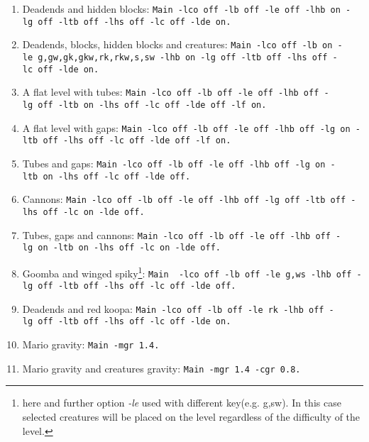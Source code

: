 \documentclass{report}
\begin{document}
\begin{enumerate}
\item Deadends and hidden blocks:\newline %
\texttt{Main~-lco~off~-lb~off~-le~off~-lhb~on~-lg~off~-ltb~off~-lhs~off~-lc~off~-lde~on.}
\item Deadends, blocks, hidden blocks and creatures:\newline %
\texttt{Main~-lco~off~-lb~on~-le~g,gw,gk,gkw,rk,rkw,s,sw~-lhb~on~-lg~off~-ltb~off~-lhs~off~-lc~off~-lde~on.}
\item A flat level with tubes: \newline %
\texttt{Main~-lco~off~-lb~off~-le~off~-lhb~off~-lg~off~-ltb~on~-lhs~off~-lc~off~-lde~off~-lf~on.}
\item A flat level with gaps: \newline %
\texttt{Main~-lco~off~-lb~off~-le~off~-lhb~off~-lg~on~-ltb~off~-lhs~off~-lc~off~-lde~off~-lf~on.}
\item Tubes and gaps: \newline %
\texttt{Main~-lco~off~-lb~off~-le~off~-lhb~off~-lg~on~-ltb~on~-lhs~off~-lc~off~-lde~off.}
\item Cannons: \newline %
\texttt{Main~-lco~off~-lb~off~-le~off~-lhb~off~-lg~off~-ltb~off~-lhs~off~-lc~on~-lde~off.}
\item Tubes, gaps and cannons: \newline %
\texttt{Main~-lco~off~-lb~off~-le~off~-lhb~off~-lg~on~-ltb~on~-lhs~off~-lc~on~-lde~off.}
\item Goomba and winged spiky\footnote{here and further option \emph{-le} used with different key(e.g. g,sw). In this case selected creatures will be placed on the level regardless of the difficulty of the level.}: \newline %
\texttt{Main ~-lco~off~-lb~off~-le~g,ws~-lhb~off~-lg~off~-ltb~off~-lhs~off~-lc~off~-lde~off.}
\item Deadends and red koopa: \newline %
\texttt{Main~-lco~off~-lb~off~-le~rk~-lhb~off~-lg~off~-ltb~off~-lhs~off~-lc~off~-lde~on.}
\item Mario gravity: \newline %
\texttt{Main~-mgr~1.4.}
\item Mario gravity and creatures gravity: \newline %
\texttt{Main~-mgr~1.4~-cgr~0.8.}


\end{enumerate}
\end{document}

